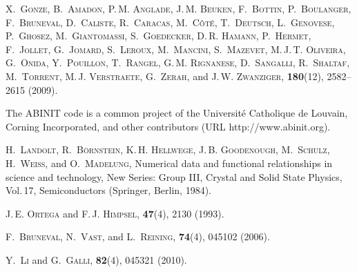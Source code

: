 \documentclass[pss]{wiley2sp} %
\begin{document}
\begin{thebibliography}{[10]}
 \textsc{X.~Gonze},  \textsc{B.~Amadon},  \textsc{P.\,M. Anglade},
  \textsc{J.\,M. Beuken},  \textsc{F.~Bottin},  \textsc{P.~Boulanger},
  \textsc{F.~Bruneval},  \textsc{D.~Caliste},  \textsc{R.~Caracas},
  \textsc{M.~C{\^{o}}t{\'{e}}},  \textsc{T.~Deutsch},  \textsc{L.~Genovese},
  \textsc{P.~Ghosez},  \textsc{M.~Giantomassi},  \textsc{S.~Goedecker},
  \textsc{D.\,R. Hamann},  \textsc{P.~Hermet},  \textsc{F.~Jollet},
  \textsc{G.~Jomard},  \textsc{S.~Leroux},  \textsc{M.~Mancini},
  \textsc{S.~Mazevet},  \textsc{M.\,J.\,T. Oliveira},  \textsc{G.~Onida},
  \textsc{Y.~Pouillon},  \textsc{T.~Rangel},  \textsc{G.\,M. Rignanese},
  \textsc{D.~Sangalli},  \textsc{R.~Shaltaf},  \textsc{M.~Torrent},
  \textsc{M.\,J. Verstraete},  \textsc{G.~Zerah},  and  \textsc{J.\,W.
  Zwanziger},
  \textbf{180}(12), 2582--2615 (2009).


\othercit
{}%
The ABINIT code is a common project of the Universit{\'e} Catholique de
  Louvain, Corning Incorporated, and other contributors (URL
  http://www.abinit.org).


\othercit
{}%
 \textsc{H.~Landolt},  \textsc{R.~B{\"o}rnstein},  \textsc{K.\,H. Hellwege},
  \textsc{J.\,B. Goodenough},  \textsc{M.~Schulz},  \textsc{H.~Weiss},  and
  \textsc{O.~Madelung},
Numerical data and functional relationships in science and technology, New
  Series: Group III, Crystal and Solid State Physics,  Vol.\,17, Semiconductors
  (Springer, Berlin, 1984).


 \textsc{J.\,E. Ortega} and  \textsc{F.\,J. Himpsel},
  \textbf{47}(4), 2130 (1993).


 \textsc{F.~Bruneval},  \textsc{N.~Vast},  and  \textsc{L.~Reining},
  \textbf{74}(4), 045102 (2006).


 \textsc{Y.~Li} and  \textsc{G.~Galli},
  \textbf{82}(4), 045321 (2010).


\end{thebibliography}
\end{document}
